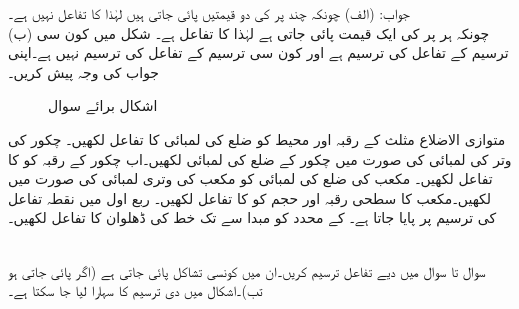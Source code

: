 جواب:\quad
(الف) چونکہ چند  پر  کی دو قیمتیں پائی جاتی ہیں لہٰذا  کا تفاعل نہیں ہے۔\\
(ب) چونکہ ہر  پر  کی ایک قیمت پائی جاتی ہے لہٰذا  کا تفاعل ہے۔
 شکل  میں کون سی ترسیم  کے تفاعل کی ترسیم ہے اور کون سی ترسیم  کے تفاعل کی ترسیم نہیں ہے۔اپنی جواب کی وجہ پیش کریں۔
\begin{figure}
\centering
\begin{subfigure}{0.5\textwidth}
\centering
{}
\end{subfigure}%
\begin{subfigure}{0.5\textwidth}
\centering
{}
\end{subfigure}%
\caption{اشکال برائے سوال }
\label{شکل_سوال_ابتدا_کیا_ترسیم_تفاعل_ہے_ب}
\end{figure}



متوازی الاضلاع مثلث کے رقبہ اور محیط کو ضلع کی لمبائی  کا تفاعل لکھیں۔
چکور کی وتر کی لمبائی  کی صورت میں چکور کے ضلع کی لمبائی لکھیں۔اب چکور کے رقبہ کو  کا تفاعل لکھیں۔
مکعب کی ضلع کی لمبائی کو مکعب کی وتری لمبائی  کی صورت میں لکھیں۔مکعب کا سطحی رقبہ اور حجم کو  کا تفاعل لکھیں۔ 
ربع اول میں نقطہ  تفاعل  کی ترسیم پر پایا جاتا ہے۔ کے محدد کو مبدا سے  تک خط کی ڈھلوان کا تفاعل لکھیں۔

\\
سوال  تا سوال  میں دیے تفاعل ترسیم کریں۔ان میں کونسی تشاکل پائی جاتی ہے (اگر پائی جاتی ہو تب)۔اشکال  میں دی ترسیم کا سہارا لیا جا سکتا ہے۔

